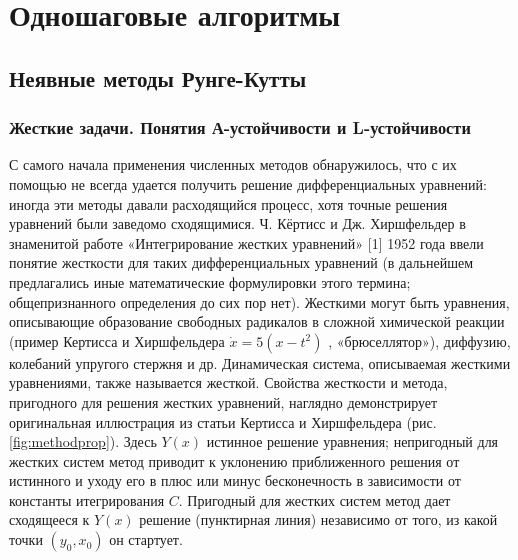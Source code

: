 \documentclass[12pt,a4paper]{book}
\begin{document}
\setcounter{chapter}{1}
\chapter[\CYRO\cyrd\cyrn\cyro\cyrsh\cyra\cyrg\cyro\cyrv\cyrery\cyre~\cyra\cyrl\cyrg\cyro\cyrr\cyri\cyrt\cyrm\cyrery]{Одношаговые алгоритмы}
\section{Неявные методы Рунге-Кутты}
\setcounter{subsection}{1}
\subsection{Жесткие задачи. Понятия А-устойчивости и L-устойчивости}

С самого начала применения численных методов обнаружилось, что с их помощью не всегда удается получить решение дифференциальных уравнений: иногда эти методы давали расходящийся процесс, хотя точные решения уравнений были заведомо сходящимися.  Ч. Кёртисс  и Дж. Хиршфельдер в знаменитой работе «Интегрирование жестких уравнений» [1] 1952 года ввели понятие жесткости для таких дифференциальных уравнений (в дальнейшем предлагались иные математические формулировки этого термина; общепризнанного определения до сих пор нет). Жесткими могут быть уравнения, описывающие образование свободных радикалов в сложной химической реакции (пример Кертисса и Хиршфельдера $ \dot{x} = 5(x-t^{2}) $ , «брюселлятор»), диффузию, колебаний упругого стержня и др. Динамическая система, описываемая жесткими уравнениями, также называется жесткой. Свойства жесткости и метода, пригодного для решения жестких уравнений, наглядно демонстрирует оригинальная иллюстрация из статьи Кертисса и Хиршфельдера (рис. \ref{fig:methodprop}). Здесь $ Y(x) $  истинное решение уравнения; непригодный для жестких систем метод приводит к уклонению приближенного решения от истинного и уходу его в плюс или минус бесконечность в зависимости от константы итегрирования $ C $. Пригодный для жестких систем метод дает сходящееся к $ Y(x) $  решение (пунктирная линия) независимо от того, из какой точки $ (y_0,x_0) $  он стартует. 
 
\end{document}

